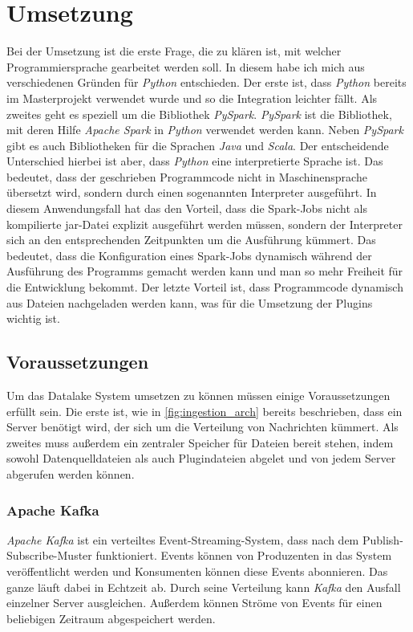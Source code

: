 \chapter{Umsetzung}

Bei der Umsetzung ist die erste Frage, die zu klären ist, mit welcher Programmiersprache gearbeitet werden soll.
In diesem habe ich mich aus verschiedenen Gründen für \textit{Python} entschieden.
Der erste ist, dass \textit{Python} bereits im Masterprojekt verwendet wurde und so die Integration leichter fällt.
Als zweites geht es speziell um die Bibliothek \textit{PySpark}.
\textit{PySpark} ist die Bibliothek, mit deren Hilfe \textit{Apache Spark} in \textit{Python} verwendet werden kann.
Neben \textit{PySpark} gibt es auch Bibliotheken für die Sprachen \textit{Java} und \textit{Scala}.
Der entscheidende Unterschied hierbei ist aber, dass \textit{Python} eine interpretierte Sprache ist.
Das bedeutet, dass der geschrieben Programmcode nicht in Maschinensprache übersetzt wird, sondern durch einen sogenannten Interpreter ausgeführt.
In diesem Anwendungsfall hat das den Vorteil, dass die Spark-Jobs nicht als kompilierte jar-Datei explizit ausgeführt werden müssen, sondern der Interpreter sich an den entsprechenden Zeitpunkten um die Ausführung kümmert.
Das bedeutet, dass die Konfiguration eines Spark-Jobs dynamisch während der Ausführung des Programms gemacht werden kann und man so mehr Freiheit für die Entwicklung bekommt.
Der letzte Vorteil ist, dass Programmcode dynamisch aus Dateien nachgeladen werden kann, was für die Umsetzung der Plugins wichtig ist.

\section{Voraussetzungen}
Um das Datalake System umsetzen zu können müssen einige Voraussetzungen erfüllt sein.
Die erste ist, wie in \ref{fig:ingestion_arch} bereits beschrieben, dass ein Server benötigt wird, der sich um die Verteilung von Nachrichten kümmert.
Als zweites muss außerdem ein zentraler Speicher für Dateien bereit stehen, indem sowohl Datenquelldateien als auch Plugindateien abgelet und von jedem Server abgerufen werden können.

\subsection{Apache Kafka}

\textit{Apache Kafka} ist ein verteiltes Event-Streaming-System, dass nach dem Publish-Subscribe-Muster funktioniert.
Events können von Produzenten in das System veröffentlicht werden und Konsumenten können diese Events abonnieren.
Das ganze läuft dabei in Echtzeit ab.
Durch seine Verteilung kann \textit{Kafka} den Ausfall einzelner Server ausgleichen.
Außerdem können Ströme von Events für einen beliebigen Zeitraum abgespeichert werden.

